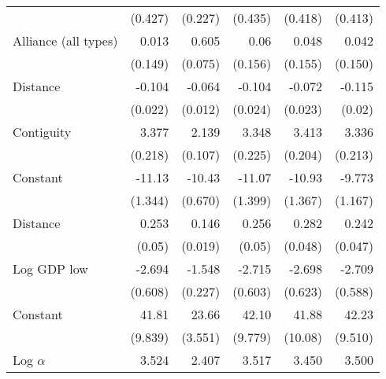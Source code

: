 \begin{table}[htbp]
\begin{tabular}{l*{5}{D{.}{.}{-1}}}
   &     (0.427)         &     (0.227)         &     (0.435)         &     (0.418)         &     (0.413)         \\
\addlinespace
Alliance (all types)&      0.013         &       0.605\sym{***}&      0.06         &      0.048         &      0.042         \\
   &     (0.149)         &    (0.075)         &     (0.156)         &     (0.155)         &     (0.150)         \\
\addlinespace
Distance&      -0.104\sym{***}&     -0.064\sym{***}&      -0.104\sym{***}&     -0.072\sym{**} &      -0.115\sym{***}\\
   &    (0.022)         &    (0.012)         &    (0.024)         &    (0.023)         &    (0.02)         \\
\addlinespace
Contiguity&       3.377\sym{***}&       2.139\sym{***}&       3.348\sym{***}&       3.413\sym{***}&       3.336\sym{***}\\
   &     (0.218)         &     (0.107)         &     (0.225)         &     (0.204)         &     (0.213)         \\
\addlinespace
Constant&      -11.13\sym{***}&      -10.43\sym{***}&      -11.07\sym{***}&      -10.93\sym{***}&      -9.773\sym{***}\\
   &     (1.344)         &     (0.670)         &     (1.399)         &     (1.367)         &     (1.167)         \\
\midrule
Distance&       0.253\sym{***}&       0.146\sym{***}&       0.256\sym{***}&       0.282\sym{***}&       0.242\sym{***}\\
   &    (0.05)         &    (0.019)         &    (0.05)         &    (0.048)         &    (0.047)         \\
\addlinespace
Log GDP low&      -2.694\sym{***}&      -1.548\sym{***}&      -2.715\sym{***}&      -2.698\sym{***}&      -2.709\sym{***}\\
   &     (0.608)         &     (0.227)         &     (0.603)         &     (0.623)         &     (0.588)         \\
\addlinespace
Constant&       41.81\sym{***}&       23.66\sym{***}&       42.10\sym{***}&       41.88\sym{***}&       42.23\sym{***}\\
   &     (9.839)         &     (3.551)         &     (9.779)         &     (10.08)         &     (9.510)         \\
\midrule
Log $\alpha$&       3.524\sym{***}&       2.407\sym{***}&       3.517\sym{***}&       3.450\sym{***}&       3.500\sym{***}\\

\end{tabular}
\end{table}
